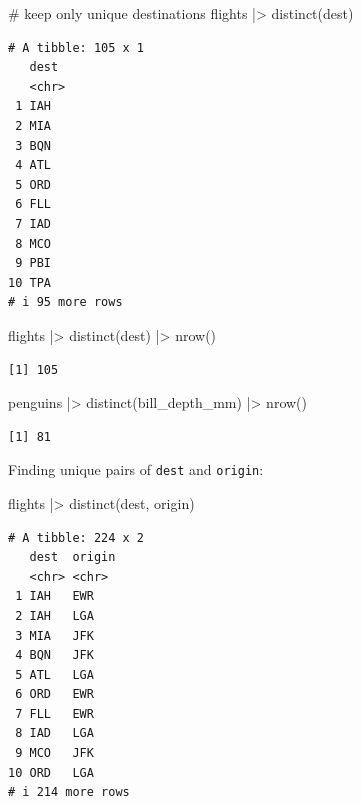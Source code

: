 \documentclass[
  letterpaper,
  DIV=11,
  numbers=noendperiod]{scrreprt}
\newenvironment{Shaded}{\begin{snugshade}}{\end{snugshade}}
\newcommand{\CommentTok}[1]{\textcolor[rgb]{0.37,0.37,0.37}{#1}}
\newcommand{\FunctionTok}[1]{\textcolor[rgb]{0.28,0.35,0.67}{#1}}
\newcommand{\NormalTok}[1]{\textcolor[rgb]{0.00,0.23,0.31}{#1}}
\newcommand{\SpecialCharTok}[1]{\textcolor[rgb]{0.37,0.37,0.37}{#1}}
\begin{document}
\begin{Shaded}
\begin{Highlighting}[]
\CommentTok{\# keep only unique destinations}
\NormalTok{flights }\SpecialCharTok{|\textgreater{}}
  \FunctionTok{distinct}\NormalTok{(dest)}
\end{Highlighting}
\end{Shaded}

\begin{verbatim}
# A tibble: 105 x 1
   dest 
   <chr>
 1 IAH  
 2 MIA  
 3 BQN  
 4 ATL  
 5 ORD  
 6 FLL  
 7 IAD  
 8 MCO  
 9 PBI  
10 TPA  
# i 95 more rows
\end{verbatim}

\begin{Shaded}
\begin{Highlighting}[]
\NormalTok{flights }\SpecialCharTok{|\textgreater{}}
  \FunctionTok{distinct}\NormalTok{(dest) }\SpecialCharTok{|\textgreater{}}
  \FunctionTok{nrow}\NormalTok{()}
\end{Highlighting}
\end{Shaded}

\begin{verbatim}
[1] 105
\end{verbatim}

\begin{Shaded}
\begin{Highlighting}[]
\NormalTok{penguins }\SpecialCharTok{|\textgreater{}}
  \FunctionTok{distinct}\NormalTok{(bill\_depth\_mm) }\SpecialCharTok{|\textgreater{}}
  \FunctionTok{nrow}\NormalTok{()}
\end{Highlighting}
\end{Shaded}

\begin{verbatim}
[1] 81
\end{verbatim}

Finding unique pairs of \texttt{dest} and \texttt{origin}:

\begin{Shaded}
\begin{Highlighting}[]
\NormalTok{flights }\SpecialCharTok{|\textgreater{}}
  \FunctionTok{distinct}\NormalTok{(dest, origin)}
\end{Highlighting}
\end{Shaded}

\begin{verbatim}
# A tibble: 224 x 2
   dest  origin
   <chr> <chr> 
 1 IAH   EWR   
 2 IAH   LGA   
 3 MIA   JFK   
 4 BQN   JFK   
 5 ATL   LGA   
 6 ORD   EWR   
 7 FLL   EWR   
 8 IAD   LGA   
 9 MCO   JFK   
10 ORD   LGA   
# i 214 more rows
\end{verbatim}
\end{document}
